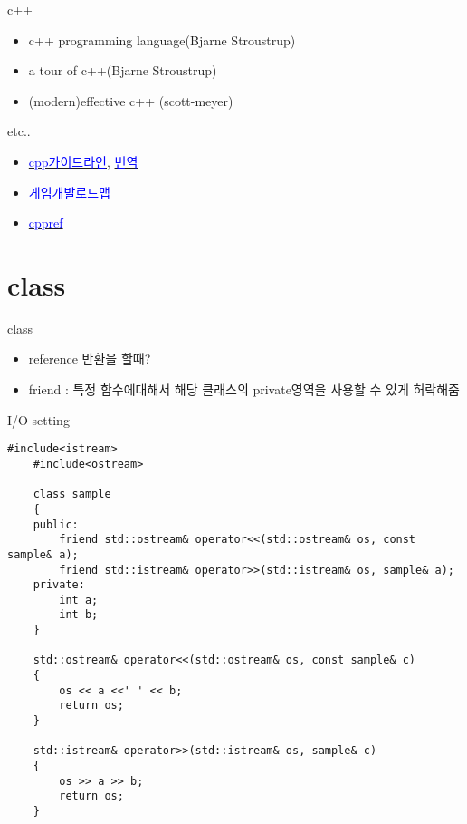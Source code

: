 \documentclass[10pt]{beamer}
\begin{document}
\begin{frame}{c++}
    \begin{itemize}
        \item c++ programming language(Bjarne Stroustrup)
        \item a tour of c++(Bjarne Stroustrup)
        \item (modern)effective c++ (scott-meyer)
    \end{itemize}
    etc..

    \begin{itemize}
        \item \href{https://github.com/isocpp/CppCoreGuidelines/blob/master/CppCoreGuidelines.md}{\textcolor{blue}{cpp가이드라인}},
        \href{https://github.com/CppKorea/CppCoreGuidelines}{\textcolor{blue}{번역}}
        \item \href{https://github.com/utilForever/game-developer-roadmap}{\textcolor{blue}{게임개발로드맵}}
        \item \href{https://en.cppreference.com/w/}{\textcolor{blue}{cppref}}
    \end{itemize}
\end{frame}


\section{class}


\begin{frame}{class}
    \begin{itemize}
        \item reference 반환을 할때?
        \item friend : 특정 함수에대해서 해당 클래스의 private영역을 사용할 수 있게 허락해줌
    \end{itemize}
\end{frame}







\begin{frame}[fragile]{I/O setting}
    \begin{lstlisting}[style = CppStyle]
    #include<istream>
    #include<ostream>

    class sample
    {
    public:
        friend std::ostream& operator<<(std::ostream& os, const sample& a);
        friend std::istream& operator>>(std::istream& os, sample& a);
    private:
        int a;
        int b; 
    }
        
    std::ostream& operator<<(std::ostream& os, const sample& c)
    {
        os << a <<' ' << b;
        return os;
    }

    std::istream& operator>>(std::istream& os, sample& c)
    {
        os >> a >> b;
        return os;
    }
    \end{lstlisting}
\end{frame}    
\end{document}
